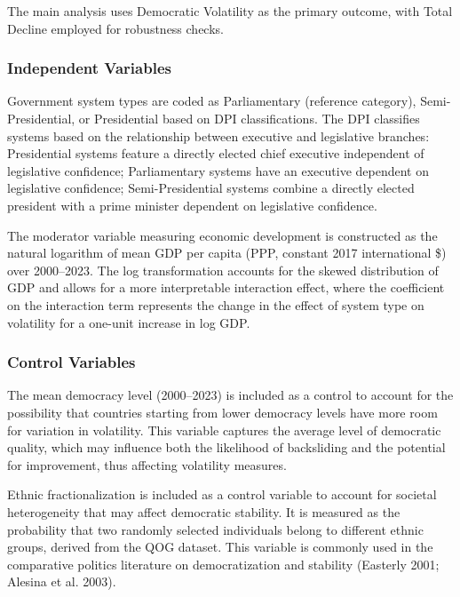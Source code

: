 \documentclass[
  letterpaper,
  DIV=11,
  numbers=noendperiod]{scrartcl}
\begin{document}
The main analysis uses Democratic Volatility as the primary outcome,
with Total Decline employed for robustness checks.

\subsubsection{Independent Variables}\label{independent-variables}

Government system types are coded as Parliamentary (reference category),
Semi-Presidential, or Presidential based on DPI classifications. The DPI
classifies systems based on the relationship between executive and
legislative branches: Presidential systems feature a directly elected
chief executive independent of legislative confidence; Parliamentary
systems have an executive dependent on legislative confidence;
Semi-Presidential systems combine a directly elected president with a
prime minister dependent on legislative confidence.

The moderator variable measuring economic development is constructed as
the natural logarithm of mean GDP per capita (PPP, constant 2017
international \$) over 2000--2023. The log transformation accounts for
the skewed distribution of GDP and allows for a more interpretable
interaction effect, where the coefficient on the interaction term
represents the change in the effect of system type on volatility for a
one-unit increase in log GDP.

\subsubsection{Control Variables}\label{control-variables}

The mean democracy level (2000--2023) is included as a control to
account for the possibility that countries starting from lower democracy
levels have more room for variation in volatility. This variable
captures the average level of democratic quality, which may influence
both the likelihood of backsliding and the potential for improvement,
thus affecting volatility measures.

Ethnic fractionalization is included as a control variable to account
for societal heterogeneity that may affect democratic stability. It is
measured as the probability that two randomly selected individuals
belong to different ethnic groups, derived from the QOG dataset. This
variable is commonly used in the comparative politics literature on
democratization and stability (Easterly 2001; Alesina et al. 2003).
\end{document}
